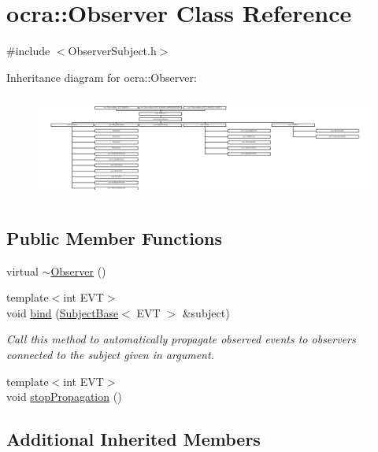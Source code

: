 \hypertarget{classocra_1_1Observer}{}\section{ocra\+:\+:Observer Class Reference}
\label{classocra_1_1Observer}


{\ttfamily \#include $<$Observer\+Subject.\+h$>$}

Inheritance diagram for ocra\+:\+:Observer\+:\begin{figure}[H]
\begin{center}
\leavevmode
\includegraphics[height=3.478261cm]{d2/d45/classocra_1_1Observer}
\end{center}
\end{figure}
\subsection*{Public Member Functions}
\begin{DoxyCompactItemize}
\item 
virtual \hyperlink{classocra_1_1Observer_ab151b904aff28f8829b0e40048f5e737}{$\sim$\+Observer} ()
\item 
{\footnotesize template$<$int E\+VT$>$ }\\void \hyperlink{classocra_1_1Observer_ab75bb7215b9e8af0e87420e29dd42c37}{bind} (\hyperlink{classocra_1_1SubjectBase}{Subject\+Base}$<$ E\+VT $>$ \&subject)
\begin{DoxyCompactList}\small\item\em Call this method to automatically propagate observed events to observers connected to the subject given in argument. \end{DoxyCompactList}\item 
{\footnotesize template$<$int E\+VT$>$ }\\void \hyperlink{classocra_1_1Observer_aa553cb069d393b84ec769f9f6367e1e3}{stop\+Propagation} ()
\end{DoxyCompactItemize}
\subsection*{Additional Inherited Members}


